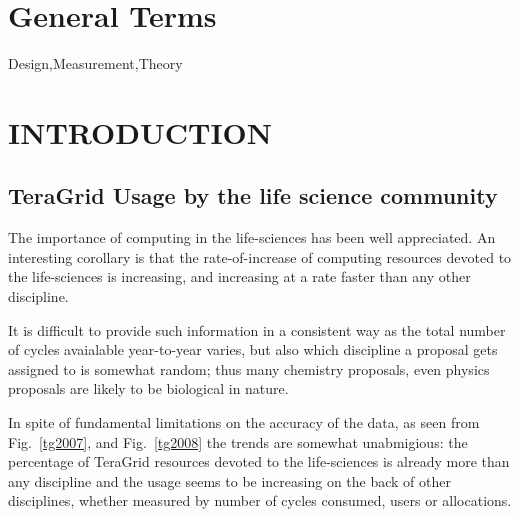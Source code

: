 \documentclass{sig-alternate}
\begin{document}

\section*{General Terms}{Design,Measurement,Theory}






\section{INTRODUCTION}

\subsection{TeraGrid Usage by the life science community}

The importance of computing in the life-sciences has been well
appreciated. An interesting corollary is that the rate-of-increase of
computing resources devoted to the life-sciences is increasing, and
increasing at a rate faster than any other discipline. 

It is difficult to provide such information in a consistent way
as the total number of cycles avaialable year-to-year varies, but
also which discipline a proposal gets assigned to is somewhat
random; thus many chemistry proposals, even physics proposals
are likely to be biological in nature. 

In spite of fundamental limitations on the accuracy of the data,
as seen from Fig.~\ref{tg2007}, and Fig.~\ref{tg2008} the trends are somewhat
unabmigious: the percentage of TeraGrid resources devoted
to the life-sciences is already more than any discipline and
the usage seems to be increasing on the back of other disciplines, 
whether measured by number of cycles consumed, users or 
allocations.
\end{document}
